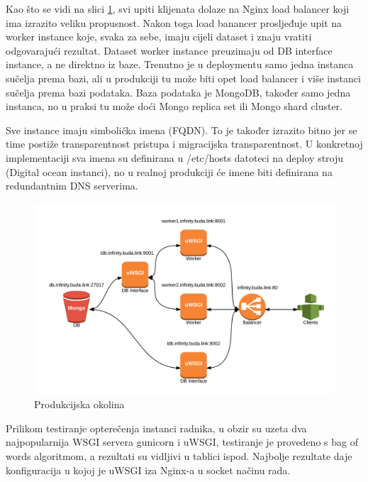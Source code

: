 \documentclass[a4paper,12pt]{article}
\begin{document}
Kao što se vidi na slici \ref{production_environment}, svi upiti klijenata dolaze na Nginx load balancer koji ima izrazito veliku propusnost. Nakon toga load banancer prosljeđuje upit na worker instance koje, svaka za sebe, imaju cijeli dataset i znaju vratiti odgovarajući rezultat. Dataset worker instance preuzimaju od DB interface instance, a ne direktno iz baze. Trenutno je u deploymentu samo jedna instanca sučelja prema bazi, ali u produkciji tu može biti opet load balancer i više instanci sučelja prema bazi podataka. Baza podataka je MongoDB, također samo jedna instanca, no u praksi tu može doći Mongo replica set ili Mongo shard cluster.

Sve instance imaju simbolička imena (FQDN). To je također izrazito bitno jer se time postiže transparentnost pristupa i migracijska transparentnost. U konkretnoj implementaciji sva imena su definirana u /etc/hosts datoteci na deploy stroju (Digital ocean instanci), no u realnoj produkciji će imene biti definirana na redundantnim DNS serverima.

\begin{figure}[!htbp]
\begin{center}
\includegraphics[width=\textwidth]{infinity.png}
\end{center}
\caption{Produkcijska okolina}\label{production_environment}
\end{figure}

Prilikom testiranje opterečenja instanci radnika, u obzir su uzeta dva najpopularnija WSGI servera gunicorn i uWSGI, testiranje je provedeno s bag of words algoritmom, a rezultati su vidljivi u tablici ispod. Najbolje rezultate daje konfiguracija u kojoj je uWSGI iza Nginx-a u socket načinu rada.

\vspace{0.3cm}
\end{document}
